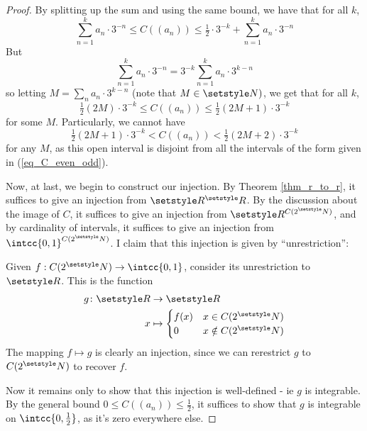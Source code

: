 \documentclass[fleqn,a4paper,11pt]{article}
\begin{document}
\begin{proof}
  By splitting up the sum and using the same bound, we have that for all \(k\),
  \begin{equation*}
   \sum_{n = 1}^k a_n \cdot 3^{-n}
    \le C((a_n))
    \le \tfrac 12 \cdot 3^{-k} + \sum_{n = 1}^k a_n \cdot 3^{-n}
  \end{equation*}
  But
  \begin{equation*}
   \sum_{n = 1}^k a_n \cdot 3^{-n}
    = 3^{-k} \sum_{n = 1}^k a_n \cdot 3^{k - n}
  \end{equation*}
  so letting \(M = \sum_n a_n \cdot 3^{k - n}\) (note that \(M \in \N)\), we get
  that for all \(k\),
  \begin{equation*} \label{eq_C_even_odd}
   \tfrac 12(2M) \cdot 3^{-k} \le C((a_n)) \le \tfrac 12(2M + 1) \cdot 3^{-k}
   \tag{\(\ast\)}
  \end{equation*}
  for some \(M\). Particularly, we cannot have
  \begin{equation*}
   \tfrac 12(2M + 1) \cdot 3^{-k} < C((a_n)) < \tfrac 12(2M + 2) \cdot 3^{-k}
  \end{equation*}
  for any \(M\), as this open interval is disjoint from all the intervals of the
  form given in (\ref{eq_C_even_odd}).

  Now, at last, we begin to construct our injection. By Theorem
  \ref{thm_r_to_r}, it suffices to give an injection from \(\R^\R\). By the
  discussion about the image of \(C\), it suffices to give an injection from
  \(\R^{C(2^\N)}\), and by cardinality of intervals, it suffices to give an
  injection from \(\intcc{0, 1}^{C(2^\N)}\). I claim that this injection is
  given by ``unrestriction'':

  Given \(f: C(2^\N) \to \intcc{0, 1}\), consider its unrestriction to \(\R\).
  This is the function
  \begin{align*}
   g\colon \R &\to \R \\
   x &\mapsto
   \begin{cases}
    f(x) & x \in C(2^\N) \\
    0 & x \notin C(2^\N)
   \end{cases}
  \end{align*}
  The mapping \(f \mapsto g\) is clearly an injection, since we can rerestrict
  \(g\) to \(C(2^\N)\) to recover \(f\).

  Now it remains only to show that this injection is well-defined - ie \(g\) is
  integrable. By the general bound \(0 \le C((a_n)) \le \tfrac 12\), it suffices
  to show that \(g\) is integrable on \(\intcc{0, \tfrac 12}\), as it's zero
  everywhere else.


\end{proof}
\end{document}
